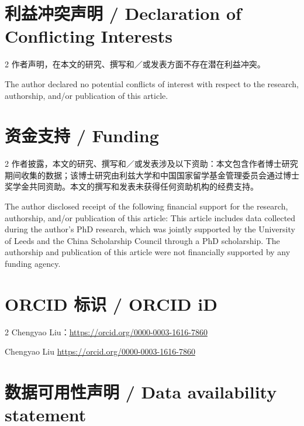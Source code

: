 \documentclass[10pt,a4paper]{article}
\begin{document}
\section*{利益冲突声明 / Declaration of Conflicting Interests}
\begin{paracol}{2}
作者声明，在本文的研究、撰写和／或发表方面不存在潜在利益冲突。\par
\switchcolumn
The author declared no potential conflicts of interest with respect to the research, authorship, and/or publication of this article.\par
\switchcolumn*
\end{paracol}
\section*{资金支持 / Funding}
\begin{paracol}{2}
作者披露，本文的研究、撰写和／或发表涉及以下资助：本文包含作者博士研究期间收集的数据；该博士研究由利兹大学和中国国家留学基金管理委员会通过博士奖学金共同资助。本文的撰写和发表未获得任何资助机构的经费支持。\par
\switchcolumn
The author disclosed receipt of the following financial support for the research, authorship, and/or publication of this article: This article includes data collected during the author’s PhD research, which was jointly supported by the University of Leeds and the China Scholarship Council through a PhD scholarship. The authorship and publication of this article were not financially supported by any funding agency.\par
\switchcolumn*
\end{paracol}
\section*{ORCID 标识 / ORCID iD}
\begin{paracol}{2}
Chengyao Liu：\url{https://orcid.org/0000-0003-1616-7860}\par
\switchcolumn
Chengyao Liu \url{https://orcid.org/0000-0003-1616-7860}\par
\switchcolumn*
\end{paracol}
\section*{数据可用性声明 / Data availability statement}
\end{document}
